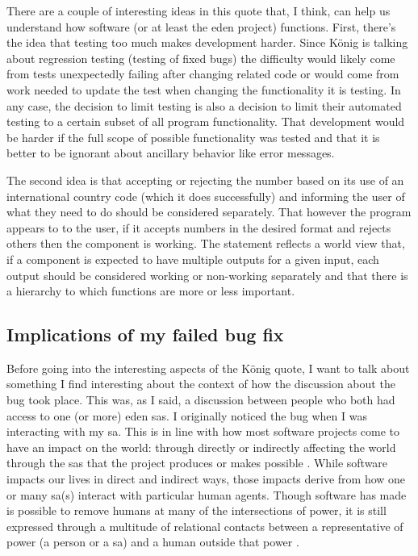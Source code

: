 \documentclass[a4paper,man,natbib,floatsintext]{apa6}
\begin{document}
   There are a couple of interesting ideas in this quote that, I think, can help us understand how software (or at least the \acrshort{eden} project) functions. First, there's the idea that testing too much makes development harder. Since K{\"o}nig is talking about regression testing (testing of fixed bugs) the difficulty would likely come from tests unexpectedly failing after changing related code or would come from work needed to update the test when changing the functionality it is testing. In any case, the decision to limit testing is also a decision to limit their automated testing to a certain subset of all program functionality. That development would be harder if the full scope of possible functionality was tested and that it is better to be ignorant about ancillary behavior like error messages.

   The second idea is that accepting or rejecting the number based on its use of an international country code (which it does successfully) and informing the user of what they need to do should be considered separately. That however the program appears to to the user, if it accepts numbers in the desired format and rejects others then the component is working. The statement reflects a world view that, if a component is expected to have multiple outputs for a given input, each output should be considered working or non-working separately and that there is a hierarchy to which functions are more or less important. 

   \subsection*{Implications of my failed bug fix}
   Before going into the interesting aspects of the K{\"o}nig quote, I want to talk about something I find interesting about the context of how the discussion about the bug took place. This was, as I said, a discussion between people who both had access to one (or more) \acrshort{eden} \glspl{sa}. I originally noticed the bug when I was interacting with my \gls{sa}. This is in line with how most software projects come to have an impact on the world: through directly or indirectly affecting the world through the \glspl{sa} that the project produces or makes possible \citep{Kitchin2011-af}. While software impacts our lives in direct and indirect ways, those impacts derive from how one or many \gls{sa}(s) interact with particular human agents. Though software has made is possible to remove humans at many of the intersections of power, it is still expressed through a multitude of relational contacts between a representative of power (a person or a \gls{sa}) and a human outside that power \citet{Cheney-Lippold2018-lw,Deluze1995-eo}. 
\end{document}
